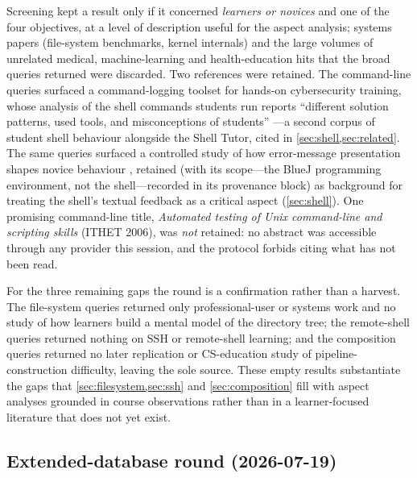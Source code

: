 Screening kept a result only if it concerned \emph{learners or novices} and
one of the four objectives, at a level of description useful for the aspect
analysis; systems papers (file-system benchmarks, kernel internals) and the
large volumes of unrelated medical, machine-learning and health-education
hits that the broad queries returned were discarded.
Two references were retained.
The command-line queries surfaced a command-logging toolset for hands-on
cybersecurity training, whose analysis of the shell commands students run
reports \enquote{different solution patterns, used tools, and misconceptions
of students} \autocite{Svabensky2021ShellCommands}---a second corpus of
student shell behaviour alongside the Shell Tutor, cited in
\cref{sec:shell,sec:related}.
The same queries surfaced a controlled study of how error-message
presentation shapes novice behaviour \autocite{Karvelas2020ErrorMessages},
retained (with its scope---the BlueJ programming environment, not the
shell---recorded in its provenance block) as background for treating the
shell's textual feedback as a critical aspect (\cref{sec:shell}).
One promising command-line title, \emph{Automated testing of Unix
command-line and scripting skills} (ITHET 2006), was \emph{not} retained: no
abstract was accessible through any provider this session, and the protocol
forbids citing what has not been read.

For the three remaining gaps the round is a confirmation rather than a
harvest.
The file-system queries returned only professional-user or systems work and
no study of how learners build a mental model of the directory tree; the
remote-shell queries returned nothing on SSH or remote-shell learning; and
the composition queries returned no later replication or CS-education study of
pipeline-construction difficulty, leaving \textcite{Doane1992UnixPrompts} the
sole source.
These empty results substantiate the gaps that \cref{sec:filesystem,sec:ssh}
and \cref{sec:composition} fill with aspect analyses grounded in course
observations rather than in a learner-focused literature that does not yet
exist.

\subsection{Extended-database round (2026-07-19)}

